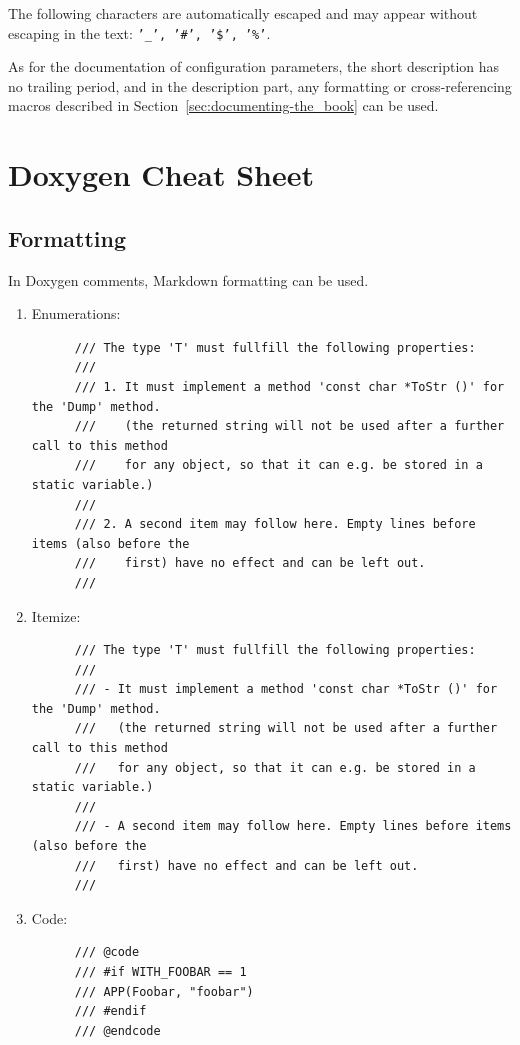 \documentclass[12pt,english,parskip=half,headheight=19pt]{scrreprt}
\begin{document}
\begin{description}
{The following characters are automatically escaped and may appear without escaping in the text:
\texttt{'\_', '\#', '\$', '\%'}.

As for the documentation of configuration parameters, the short description has no trailing period, and in the description part, any formatting or cross-referencing macros described in Section~\ref{sec:documenting-the_book} can be used.




\section{Doxygen Cheat Sheet}


\subsection{Formatting}

In Doxygen comments, Markdown formatting can be used.

\begin{enumerate}
  \item Enumerations:
    \begin{lstlisting}
      /// The type 'T' must fullfill the following properties:
      ///
      /// 1. It must implement a method 'const char *ToStr ()' for the 'Dump' method.
      ///    (the returned string will not be used after a further call to this method
      ///    for any object, so that it can e.g. be stored in a static variable.)
      ///
      /// 2. A second item may follow here. Empty lines before items (also before the
      ///    first) have no effect and can be left out.
      ///
    \end{lstlisting}
  \item Itemize:
    \begin{lstlisting}
      /// The type 'T' must fullfill the following properties:
      ///
      /// - It must implement a method 'const char *ToStr ()' for the 'Dump' method.
      ///   (the returned string will not be used after a further call to this method
      ///   for any object, so that it can e.g. be stored in a static variable.)
      ///
      /// - A second item may follow here. Empty lines before items (also before the
      ///   first) have no effect and can be left out.
      ///
    \end{lstlisting}
  \item Code:
    \begin{lstlisting}
      /// @code
      /// #if WITH_FOOBAR == 1
      /// APP(Foobar, "foobar")
      /// #endif
      /// @endcode
    \end{lstlisting}
\end{enumerate}



}
\end{description}
\end{document}
